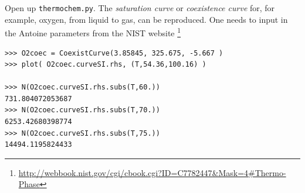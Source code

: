 Open up \verb|thermochem.py|.  The \emph{saturation curve} or \emph{coexistence curve} for, for example, oxygen, from liquid to gas, can be reproduced.  One needs to input in the Antoine parameters from the NIST website \footnote{\url{http://webbook.nist.gov/cgi/cbook.cgi?ID=C7782447&Mask=4\#Thermo-Phase}}

\begin{lstlisting}
>>> O2coec = CoexistCurve(3.85845, 325.675, -5.667 )                                            
>>> plot( O2coec.curveSI.rhs, (T,54.36,100.16) )   

>>> N(O2coec.curveSI.rhs.subs(T,60.))
731.804072053687
>>> N(O2coec.curveSI.rhs.subs(T,70.))
6253.42680398774
>>> N(O2coec.curveSI.rhs.subs(T,75.))
14494.1195824433
\end{lstlisting}



